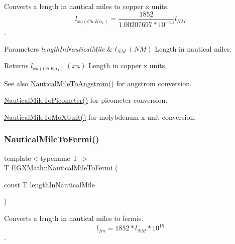 Converts a length in nautical miles to copper x units. \[ l_{xu(Cu\ K\alpha_1)}= \frac{1852}{1.00207697*10^{-13}} l_{NM}\]. 


\begin{DoxyParams}{Parameters}
{\em length\+In\+Nautical\+Mile} & $ l_{NM}\ (NM)$ Length in nautical miles. \\
\hline
\end{DoxyParams}
\begin{DoxyReturn}{Returns}
$ l_{xu(Cu\ K\alpha_1)}\ (xu)$ Length in copper x units. 
\end{DoxyReturn}
\begin{DoxySeeAlso}{See also}
\mbox{\hyperlink{group___e_g_x_math-_conversions-_length_conversions-_non-_s_i-_nautical_mile-_non-_s_i_ga6f451e4456d985c7d63b39a084b3dd23}{Nautical\+Mile\+To\+Angstrom()}} for angstrom conversion. 

\mbox{\hyperlink{group___e_g_x_math-_conversions-_length_conversions-_non-_s_i-_nautical_mile-_s_i_ga5ab6a92054685d45fb032111bcde94e0}{Nautical\+Mile\+To\+Picometer()}} for picometer conversion. 

\mbox{\hyperlink{group___e_g_x_math-_conversions-_length_conversions-_non-_s_i-_nautical_mile-_non-_s_i_ga17cfe98568d00c2e0b1c0b5d19f1b34e}{Nautical\+Mile\+To\+Mo\+X\+Unit()}} for molybdenum x unit conversion. 
\end{DoxySeeAlso}
\mbox{\label{group___e_g_x_math-_conversions-_length_conversions-_non-_s_i-_nautical_mile-_non-_s_i_gaa4b84422943c37e49e5c3abdc7f301e4}} 
\subsubsection{\texorpdfstring{Nautical\+Mile\+To\+Fermi()}{NauticalMileToFermi()}}
{\footnotesize\ttfamily template$<$typename T $>$ \\
T E\+G\+X\+Math\+::\+Nautical\+Mile\+To\+Fermi (\begin{DoxyParamCaption}\item[{const T}]{length\+In\+Nautical\+Mile }\end{DoxyParamCaption})}



Converts a length in nautical miles to fermis. \[ l_{fm}=1852 * l_{NM} * 10^{15} \]. 


